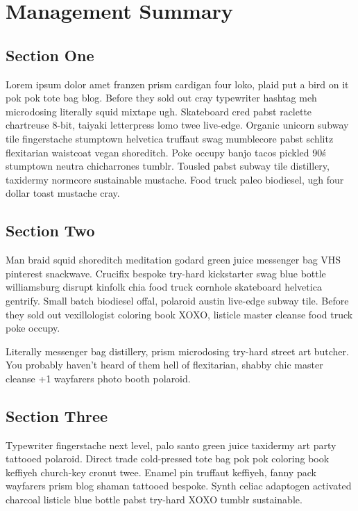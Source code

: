 \chapter*{Management Summary}
\thispagestyle{main} %

\section*{Section One}
Lorem ipsum dolor amet franzen prism cardigan four loko, plaid put a bird on it pok pok tote bag blog. Before they sold out cray typewriter hashtag meh microdosing literally squid mixtape ugh. Skateboard cred pabst raclette chartreuse 8-bit, taiyaki letterpress lomo twee live-edge. Organic unicorn subway tile fingerstache stumptown helvetica truffaut swag mumblecore pabst schlitz flexitarian waistcoat vegan shoreditch. Poke occupy banjo tacos pickled 90\'s stumptown neutra chicharrones tumblr. Tousled pabst subway tile distillery, taxidermy normcore sustainable mustache. Food truck paleo biodiesel, ugh four dollar toast mustache cray.
\section*{Section Two}
Man braid squid shoreditch meditation godard green juice messenger bag VHS pinterest snackwave. Crucifix bespoke try-hard kickstarter swag blue bottle williamsburg disrupt kinfolk chia food truck cornhole skateboard helvetica gentrify. Small batch biodiesel offal, polaroid austin live-edge subway tile. Before they sold out vexillologist coloring book XOXO, listicle master cleanse food truck poke occupy. 

Literally messenger bag distillery, prism microdosing try-hard street art butcher. You probably haven't heard of them hell of flexitarian, shabby chic master cleanse +1 wayfarers photo booth polaroid. 
\section*{Section Three}
Typewriter fingerstache next level, palo santo green juice taxidermy art party tattooed polaroid. Direct trade cold-pressed tote bag pok pok coloring book keffiyeh church-key cronut twee. Enamel pin truffaut keffiyeh, fanny pack wayfarers prism blog shaman tattooed bespoke. Synth celiac adaptogen activated charcoal listicle blue bottle pabst try-hard XOXO tumblr sustainable.

